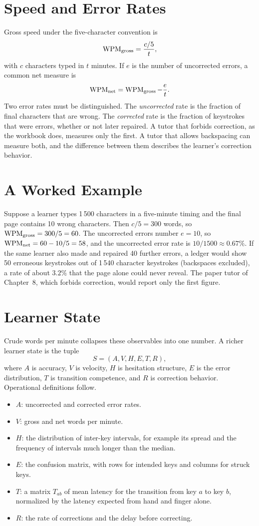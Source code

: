 \section{Speed and Error Rates}

Gross speed under the five-character convention is
\[
\operatorname{WPM}_{\text{gross}}=\frac{c/5}{t},
\]
with $c$ characters typed in $t$ minutes. If $e$ is the number of uncorrected errors, a common net measure is
\[
\operatorname{WPM}_{\text{net}}=\operatorname{WPM}_{\text{gross}}-\frac{e}{t}.
\]
Two error rates must be distinguished. The \emph{uncorrected} rate is the fraction of final characters that are wrong. The \emph{corrected} rate is the fraction of keystrokes that were errors, whether or not later repaired. A tutor that forbids correction, as the workbook does, measures only the first. A tutor that allows backspacing can measure both, and the difference between them describes the learner's correction behavior.

\section{A Worked Example}

Suppose a learner types 1\,500 characters in a five-minute timing and the final page contains 10 wrong characters. Then $c/5=300$ words, so $\operatorname{WPM}_{\text{gross}}=300/5=60$. The uncorrected errors number $e=10$, so $\operatorname{WPM}_{\text{net}}=60-10/5=58$, and the uncorrected error rate is $10/1500\approx 0.67\%$. If the same learner also made and repaired 40 further errors, a ledger would show 50 erroneous keystrokes out of 1\,540 character keystrokes (backspaces excluded), a rate of about $3.2\%$ that the page alone could never reveal. The paper tutor of Chapter~8, which forbids correction, would report only the first figure.

\section{Learner State}

Crude words per minute collapses these observables into one number. A richer learner state is the tuple
\[
S=(A,V,H,E,T,R),
\]
where $A$ is accuracy, $V$ is velocity, $H$ is hesitation structure, $E$ is the error distribution, $T$ is transition competence, and $R$ is correction behavior. Operational definitions follow.

\begin{itemize}
\item $A$: uncorrected and corrected error rates.
\item $V$: gross and net words per minute.
\item $H$: the distribution of inter-key intervals, for example its spread and the frequency of intervals much longer than the median.
\item $E$: the confusion matrix, with rows for intended keys and columns for struck keys.
\item $T$: a matrix $T_{ab}$ of mean latency for the transition from key $a$ to key $b$, normalized by the latency expected from hand and finger alone.
\item $R$: the rate of corrections and the delay before correcting.
\end{itemize}

